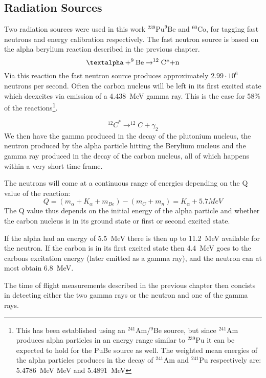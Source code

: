 \documentclass[main.tex]{subfiles}
\begin{document}
\subsection{Radiation Sources}
Two radiation sources were used in this work $^\text{239}\text{Pu}^\text{9}\text{Be}$ and $^\text{60}\text{Co}$, for tagging fast neutrons and energy calibration respectively. The fast neutron source is based on the alpha berylium reaction described in the previous chapter.
$$\text{\textalpha}+^\text{9}\text{Be}\rightarrow^\text{12}\text{C*+n}$$
Via this reaction the fast neutron source produces approximately $\text{2.99}\cdot\text{10}^\text{6}$ neutrons per second\cite{Scherzinger:2017}. Often the carbon nucleus will be left in its first excited state which deexcites via emission of a \SI{4.438}{\mega\eV} gamma ray. This is the case for 58\% of the reactions\cite{Scherzinger:2015}\footnote{This has been established using an $^\text{241}$Am/$^\text{9}$Be source, but since $^\text{241}$Am produces alpha particles in an energy range similar to $^\text{239}$Pu it can be expected to hold for the PuBe source as well. The weighted mean energies of the alpha particles produces in the decay of $^\text{241}$Am and $^\text{241}$Pu respectively are: \SI{5.4786}{\mega\eV} MeV and \SI{5.4891}{\mega\eV}\cite{Scherzinger:2017}}.

$$^{12}C^ {*}\rightarrow^{12}C+\gamma_2$$
We then have the gamma produced in the decay of the plutonium nucleus, the neutron produced by the alpha particle hitting the Berylium nucleus and the gamma ray produced in the decay of the carbon nucleus, all of which happens within a very short time frame. 

The neutrons will come at a continuous range of energies depending on the Q value of the reaction:
$$Q = (m_\alpha + K_\alpha + m_{Be}) - (m_{C} + m_n) = K_\alpha + 5.7 MeV$$
The Q value thus depends on the initial energy of the alpha particle and whether the carbon nucleus is in its ground state or first or second excited state. 

If the alpha had an energy of \SI{5.5}{\MeV} there is then up to \SI{11.2}{\MeV} available for the neutron. If the carbon is in its first excited state then \SI{4.4}{\MeV} goes to the carbons excitation energy (later emitted as a gamma ray), and the neutron can at most obtain \SI{6.8}{\MeV}. 

The time of flight measurements described in the previous chapter then concists in detecting either the two gamma rays or the neutron and one of the gamma rays.
\end{document}
